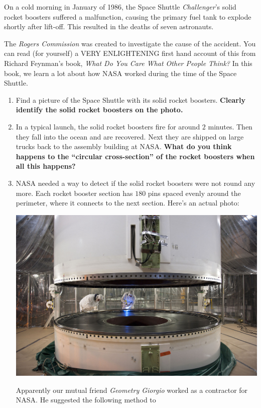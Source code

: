 \documentclass[nooutcomes,noauthor,hints,handout]{ximera}
\begin{document}
\begin{question}
  On a cold morning in January of 1986, the Space Shuttle
  \textit{Challenger}'s solid rocket boosters suffered a malfunction,
  causing the primary fuel tank to explode shortly after lift-off.
  This resulted in the deaths of seven astronauts. 


  The \textit{Rogers Commission} was created to investigate the cause
  of the accident.  You can read (for yourself) a VERY ENLIGHTENING
  first hand account of this from Richard Feynman's book, \textit{What
    Do You Care What Other People Think?} In this book, we learn a lot
  about how NASA worked during the time of the Space Shuttle.

  \begin{enumerate}
  \item Find a picture of the Space Shuttle with its solid rocket
    boosters. \textbf{Clearly identify the solid rocket boosters on the photo.}
  \item In a typical launch, the solid rocket boosters fire for around
    $2$ minutes. Then they fall into the ocean and are recovered. Next
    they are shipped on large trucks back to the assembly
    building at NASA. \textbf{What do you think happens to the ``circular
    cross-section'' of the rocket boosters when all this happens?}
  \item NASA needed a way to detect if the solid rocket boosters were
    not round any more. Each rocket booster section has $180$ pins
    spaced evenly around the perimeter, where it connects to the next
    section. Here's an actual photo:
    \begin{center}%
      \includegraphics[width=.6\textwidth]{srbSections.jpg}
    \end{center}
    Apparently our mutual friend \textit{Geometry Giorgio} worked as a
    contractor for NASA. He suggested the following method to

\end{enumerate}
\end{question}
\end{document}
